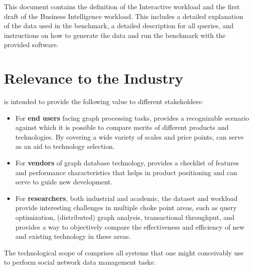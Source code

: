 This document contains the definition of the Interactive workload and the first
draft of the Business Intelligence workload. This includes a detailed
explanation of the data used in the \ldbcsnb benchmark, a detailed description
for all queries, and instructions on how to generate the data and run the
benchmark with the provided software.


\section{Relevance to the Industry}

\ldbcsnb is intended to provide the following value to different stakeholders:

\begin{itemize}
 \item For \textbf{end users} facing graph processing tasks, \ldbcsnb provides
     a recognizable scenario against which it is possible to compare merits of
     different products and technologies.  By covering a wide variety of scales
     and price points, \ldbcsnb can serve as an aid to technology selection.
 \item For \textbf{vendors} of graph database technology, \ldbcsnb provides a
     checklist of features and performance characteristics that helps in
     product positioning and can serve to guide new development.
 \item For \textbf{researchers}, both industrial and academic, the \ldbcsnb
     dataset and workload provide interesting challenges in multiple
     choke point areas, such as query optimization, (distributed) graph
     analysis, transactional throughput, and provides a way to objectively
     compare the effectiveness and efficiency of new and existing technology in
     these areas.
\end{itemize}

The technological scope of \ldbcsnb comprises all systems that one might
conceivably use to perform social network data management tasks:

